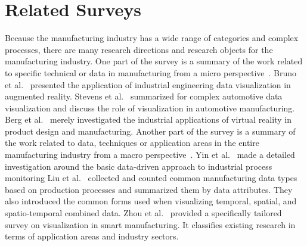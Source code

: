\documentclass[a4paper,fleqn]{cas-dc}
\begin{document}
\section{Related Surveys}
Because the manufacturing industry has a wide range of categories and complex processes, there are many research directions and research objects for the manufacturing industry.
One part of the survey is a summary of the work related to specific technical or data in manufacturing from a micro perspective~\cite{bruno2006visualization, stevens2007visualization, berg2017industry}. 
Bruno et al.~\cite{bruno2006visualization} presented the application of industrial engineering data visualization in augmented reality.
Stevens et al.~\cite{stevens2007visualization} summarized    for complex automotive data visualization and discuss the role of visualization in automotive manufacturing.
Berg et al.~\cite{berg2017industry} merely investigated the industrial applications of virtual reality in product design and manufacturing.
Another part of the survey is a summary of the work related to data, techniques or application areas in the entire manufacturing industry from a macro perspective~\cite{yin2014review, liu2021survey, zhou2019survey, font2019interactive, de2020survey}.
Yin et al.~\cite{yin2014review} made a detailed investigation around the basic data-driven approach to industrial process monitoring
Liu et al.~\cite{liu2021survey} collected and counted common manufacturing data types based on production processes and summarized them by data attributes. They also introduced the common forms used when visualizing temporal, spatial, and spatio-temporal combined data.
Zhou et al.~\cite{zhou2019survey} provided a specifically tailored survey on visualization in smart manufacturing. It classifies existing research in terms of application areas and industry sectors.
\end{document}
